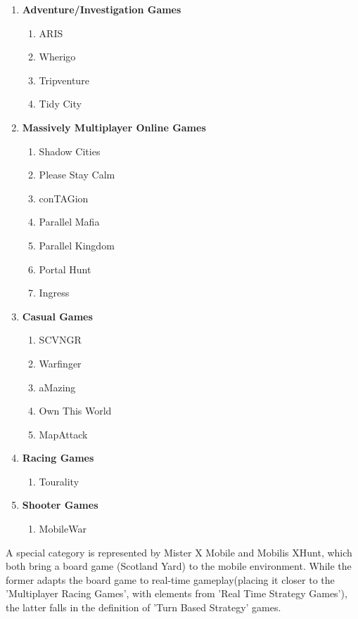 \begin{enumerate}
  \item \textbf{Adventure/Investigation Games}
  		\begin{enumerate}
  	  		\item ARIS
  	  		\item Wherigo
  	  		\item Tripventure
  	  		\item Tidy City	  
  		\end{enumerate}
  		
  \item \textbf{Massively Multiplayer Online Games}
  		\begin{enumerate}
  	  		\item Shadow Cities
  	  		\item Please Stay Calm
  	  		\item conTAGion
  	  		\item Parallel Mafia
  	  		\item Parallel Kingdom
  	  		\item Portal Hunt
  	  		\item Ingress
  		\end{enumerate}
  		
  \item \textbf{Casual Games}
  		\begin{enumerate}
  	  		\item SCVNGR
  	  		\item Warfinger  	  		
  	  		\item aMazing 	
  	  		\item Own This World
  	  		\item MapAttack	  	  		
  		\end{enumerate}
  		  		  		
  \item \textbf{Racing Games}
  		\begin{enumerate}
  	  		\item Tourality  	  		 	  		  	  		
  		\end{enumerate}
  		
  \item \textbf{Shooter Games}
  		\begin{enumerate}
  	  		\item MobileWar	  		  	  		
  		\end{enumerate}  
\end{enumerate}

A special category is represented by Mister X Mobile and Mobilis XHunt, which
both bring a board game (Scotland Yard) to the mobile environment. While the
former adapts the board game to real-time gameplay(placing it closer to the
'Multiplayer Racing Games', with elements from 'Real Time Strategy Games'), the
latter falls in the definition of 'Turn Based Strategy' games.

